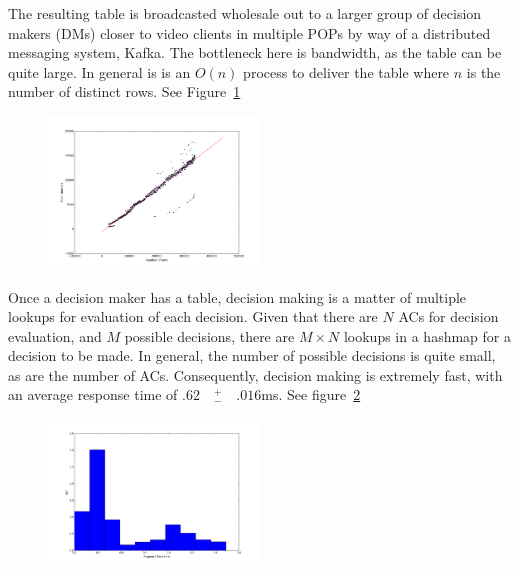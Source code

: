  The resulting table is broadcasted wholesale out to a larger group of decision makers (DMs) closer to video clients in multiple POPs by way of a distributed messaging system, Kafka. The bottleneck here is bandwidth, as the table can be quite large.  In general is is an $O(n)$ process to deliver the table where $n$ is the number of distinct rows. See Figure~\ref{fig:fetching-scale}

\begin{figure}[h!]
\centering
 \includegraphics[width=0.5\textwidth] {figures/scale/fetch_time_scale.pdf}
\label{fig:fetching-scale}
\end{figure}

 Once a decision maker has a table, decision making is a matter of multiple lookups for evaluation of each decision. Given that there are $N$ ACs for decision evaluation, and $M$ possible decisions, there are $M \times N$ lookups in a hashmap for a decision to be made. In general, the number of possible decisions is quite small, as are the number of ACs. Consequently, decision making is extremely fast, with an average response time of $.62 \quad ^{+}_{-}\quad .016$ms. See figure~\ref{fig:query-scale}    

\begin{figure}[h!]
\centering
 \includegraphics[width=0.5\textwidth] {figures/scale/query_scale.pdf}
\label{fig:query-scale}
\end{figure}


